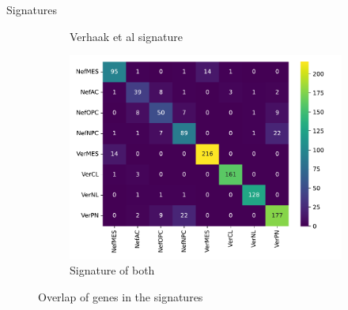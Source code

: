 \documentclass[aspectratio=169,9pt]{beamer}
\begin{document}
\begin{frame}{Signatures}
\begin{adjustwidth}{-5cm}{-5cm}
\begin{figure}
\begin{subfigure}[c]{0.38\textwidth}
                    \caption{Verhaak et al signature}
                \end{subfigure}
                \pause
                \begin{subfigure}[c]{0.38\textwidth}
                    \centering
                    \includegraphics[width=\textwidth]{signature_overlap_All}
                    \caption{Signature of both}
                \end{subfigure}
                \pause[1]\caption{Overlap of genes in the signatures}
            \end{figure}
        \end{adjustwidth}
    \end{frame}
\end{document}

